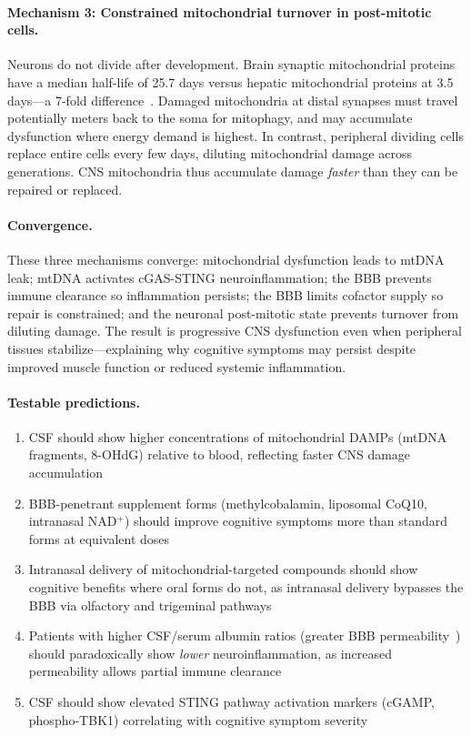 \begin{speculation}
\paragraph{Mechanism 3: Constrained mitochondrial turnover in post-mitotic cells.}
Neurons do not divide after development. Brain synaptic mitochondrial proteins have a median half-life of 25.7 days versus hepatic mitochondrial proteins at 3.5 days---a 7-fold difference~\cite{mitochondrial_halflife_neurons_2023}. Damaged mitochondria at distal synapses must travel potentially meters back to the soma for mitophagy, and may accumulate dysfunction where energy demand is highest. In contrast, peripheral dividing cells replace entire cells every few days, diluting mitochondrial damage across generations. CNS mitochondria thus accumulate damage \emph{faster} than they can be repaired or replaced.

\paragraph{Convergence.}
These three mechanisms converge: mitochondrial dysfunction leads to mtDNA leak; mtDNA activates cGAS-STING neuroinflammation; the BBB prevents immune clearance so inflammation persists; the BBB limits cofactor supply so repair is constrained; and the neuronal post-mitotic state prevents turnover from diluting damage. The result is progressive CNS dysfunction even when peripheral tissues stabilize---explaining why cognitive symptoms may persist despite improved muscle function or reduced systemic inflammation.

\paragraph{Testable predictions.}
\begin{enumerate}
    \item CSF should show higher concentrations of mitochondrial DAMPs (mtDNA fragments, 8-OHdG) relative to blood, reflecting faster CNS damage accumulation
    \item BBB-penetrant supplement forms (methylcobalamin, liposomal CoQ10, intranasal NAD$^+$) should improve cognitive symptoms more than standard forms at equivalent doses
    \item Intranasal delivery of mitochondrial-targeted compounds should show cognitive benefits where oral forms do not, as intranasal delivery bypasses the BBB via olfactory and trigeminal pathways~\cite{intranasal_NAD_2024}
    \item Patients with higher CSF/serum albumin ratios (greater BBB permeability~\cite{Natelson_BBB_MECFS_2001}) should paradoxically show \emph{lower} neuroinflammation, as increased permeability allows partial immune clearance
    \item CSF should show elevated STING pathway activation markers (cGAMP, phospho-TBK1) correlating with cognitive symptom severity
\end{enumerate}


\end{speculation}
